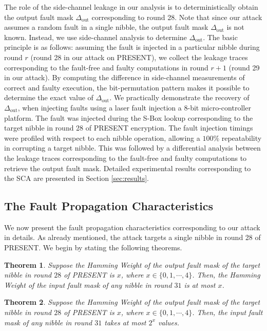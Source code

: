 \documentclass[10pt, conference, compsocconf]{IEEEtran}  %
\newtheorem{Theorem}{Theorem}
\numberwithin{Definition}{section}
\numberwithin{Claim}{section}
\begin{document}
The role of the side-channel leakage in our analysis is to deterministically obtain the output fault mask $\Delta_{\text{out}}$ corresponding to round 28. Note that since our attack assumes a random fault in a single nibble, the output fault mask $\Delta_{\text{out}}$ is not known. Instead, we use side-channel analysis to determine $\Delta_{\text{out}}$. The basic principle is as follows: assuming the fault is injected in a particular nibble during round $r$ (round 28 in our attack on PRESENT), we collect the leakage traces corresponding to the fault-free and faulty computations in round $r+1$ (round 29 in our attack). By computing the difference in side-channel measurements of correct and faulty execution, the bit-permutation pattern makes it possible to determine the exact value of $\Delta_{\text{out}}$. 
We practically demonstrate the recovery of $\Delta_{\text{out}}$, when injecting faults using a laser fault injection a 8-bit micro-controller platform. %
The fault was injected during the S-Box lookup corresponding to the target nibble in round 28 of PRESENT encryption. %
The fault injection timings were profiled with respect to each nibble operation, allowing a $100\%$ repeatability in corrupting a target nibble. %
This was followed by a differential analysis between the leakage traces corresponding to the fault-free and faulty computations to retrieve the output fault mask. Detailed experimental results corresponding to the SCA are presented in Section \ref{sec:results}.

\subsection{The Fault Propagation Characteristics}
\label{subsec:propagation}

We now present the fault propagation characteristics corresponding to our attack in details. As already mentioned, the attack targets a single nibble in round 28 of PRESENT. We begin by stating the following theorems.

\begin{Theorem}
\label{th:HW}
Suppose the Hamming Weight of the output fault mask of the target nibble in round $28$ of PRESENT is $x$, where $x\in\{0,1,\cdots,4\}$. Then, the Hamming Weight of the input fault mask of any nibble in round $31$ is at most $x$.
\end{Theorem}
\begin{Theorem}
\label{th:Val}
Suppose the Hamming Weight of the output fault mask of the target nibble in round $28$ of PRESENT is $x$, where $x\in\{0,1,\cdots,4\}$. Then, the input fault mask of any nibble in round $31$ takes at most $2^x$ values.\\
\end{Theorem}
\end{document}
